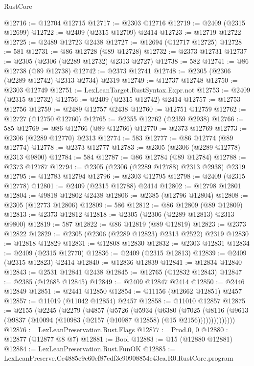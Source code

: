 \begin{lexlean}{RustCore}
\begin{coremodule}
@12716 := @12704 @12715
@12717 := @2303 @12716
@12719 := @2409 (@2315 @12699)
@12722 := @2409 (@2315 @12709) @2414
@12723 := @12719 @12722
@12725 := @2489 @12723 @2438
@12727 := @12694 (@12717 @12725)
@12728 := 581
@12731 := @86 @12728 (@89 @12728)
@12732 := @2373 @12731
@12737 := @2305 (@2306 (@2289 @12732) @2313 @2727)
@12738 := 582
@12741 := @86 @12738 (@89 @12738)
@12742 := @2373 @12741
@12748 := @2305 (@2306 (@2289 @12742) @2313 @2734) @2319
@12749 := @12737 @12748
@12750 := @2303 @12749
@12751 := LexLeanTarget.RustSyntax.Expr.not
@12753 := @2409 (@2315 @12732)
@12756 := @2409 (@2315 @12742) @2414
@12757 := @12753 @12756
@12759 := @2489 @12757 @2438
@12760 := @12751 @12759
@12762 := @12727 (@12750 @12760)
@12765 := @2355 @12762 (@2359 @2938)
@12766 := 585
@12769 := @86 @12766 (@89 @12766)
@12770 := @2373 @12769
@12773 := @2306 (@2289 @12770) @2313
@12774 := 583
@12777 := @86 @12774 (@89 @12774)
@12778 := @2373 @12777
@12783 := @2305 (@2306 (@2289 @12778) @2313 @9800)
@12784 := 584
@12787 := @86 @12784 (@89 @12784)
@12788 := @2373 @12787
@12794 := @2305 (@2306 (@2289 @12788) @2313 @2938) @2319
@12795 := @12783 @12794
@12796 := @2303 @12795
@12798 := @2409 (@2315 @12778)
@12801 := @2409 (@2315 @12788) @2414
@12802 := @12798 @12801
@12804 := @9818 @12802 @2438
@12806 := @2385 (@12796 @12804)
@12808 := @2305 (@12773 @12806)
@12809 := 586
@12812 := @86 @12809 (@89 @12809)
@12813 := @2373 @12812
@12818 := @2305 (@2306 (@2289 @12813) @2313 @9800)
@12819 := 587
@12822 := @86 @12819 (@89 @12819)
@12823 := @2373 @12822
@12829 := @2305 (@2306 (@2289 @12823) @2313 @2522) @2319
@12830 := @12818 @12829
@12831 := @12808 @12830
@12832 := @2303 @12831
@12834 := @2409 (@2315 @12770)
@12836 := @2409 (@2315 @12813)
@12839 := @2409 (@2315 @12823) @2414
@12840 := @12836 @12839
@12841 := @12834 @12840
@12843 := @2531 @12841 @2438
@12845 := @12765 (@12832 @12843)
@12847 := @2385 (@12685 @12845)
@12849 := @2409 @12847 @2414
@12850 := @2446 @12849
@12851 := @2441 @12850
@12854 := @11156 (@12662 @12851) @2457
@12857 := @11019 (@11042 @12854) @2457
@12858 := @11010 @12857
@12875 := @2155
    (@2245
      (@2279
        (@4857
          (@5726
            (@5934
              (@6380
                (@7025
                  (@8116
                    (@9613 (@9837 (@10094 (@10983 (@2157 (@10987 @12858) (@15 @2156))))))))))))))
@12876 := LexLeanPreservation.Rust.Flags
@12877 := Prod.{0, 0}
@12880 := @12877 (@12877 @8 @7)
@12881 := Bool
@12883 := @15 (@12880 @12881)
@12884 := LexLeanPreservation.Rust.FunOK
@12885 := LexLeanPreserve.Ce4885e9c60ef87cdf3c90908854e43ca.R0.RustCore.program

\end{coremodule}
\end{lexlean}
